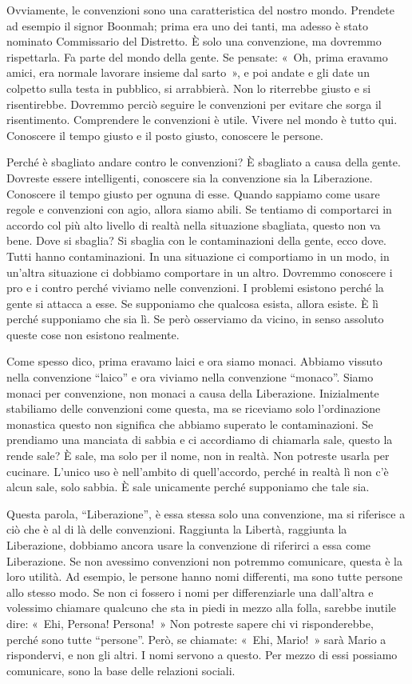 Ovviamente, le convenzioni sono una caratteristica del nostro mondo.
Prendete ad esempio il signor Boonmah; prima era uno dei tanti, ma
adesso è stato nominato Commissario del Distretto. È solo una
convenzione, ma dovremmo rispettarla. Fa parte del mondo della gente. Se
pensate: «~Oh, prima eravamo amici, era normale lavorare insieme dal
sarto~», e poi andate e gli date un colpetto sulla testa in pubblico, si
arrabbierà. Non lo riterrebbe giusto e si risentirebbe. Dovremmo perciò
seguire le convenzioni per evitare che sorga il risentimento.
Comprendere le convenzioni è utile. Vivere nel mondo è tutto qui.
Conoscere il tempo giusto e il posto giusto, conoscere le persone.

Perché è sbagliato andare contro le convenzioni? È sbagliato a causa
della gente. Dovreste essere intelligenti, conoscere sia la convenzione
sia la Liberazione. Conoscere il tempo giusto per ognuna di esse. Quando
sappiamo come usare regole e convenzioni con agio, allora siamo abili.
Se tentiamo di comportarci in accordo col più alto livello di realtà
nella situazione sbagliata, questo non va bene. Dove si sbaglia? Si
sbaglia con le contaminazioni della gente, ecco dove. Tutti hanno
contaminazioni. In una situazione ci comportiamo in un modo, in un'altra
situazione ci dobbiamo comportare in un altro. Dovremmo conoscere i pro
e i contro perché viviamo nelle convenzioni. I problemi esistono perché
la gente si attacca a esse. Se supponiamo che qualcosa esista, allora
esiste. È lì perché supponiamo che sia lì. Se però osserviamo da vicino,
in senso assoluto queste cose non esistono realmente.

Come spesso dico, prima eravamo laici e ora siamo monaci. Abbiamo
vissuto nella convenzione ``laico'' e ora viviamo nella convenzione
``monaco''. Siamo monaci per convenzione, non monaci a causa della
Liberazione. Inizialmente stabiliamo delle convenzioni come questa, ma
se riceviamo solo l'ordinazione monastica questo non significa che
abbiamo superato le contaminazioni. Se prendiamo una manciata di sabbia
e ci accordiamo di chiamarla sale, questo la rende sale? È sale, ma solo
per il nome, non in realtà. Non potreste usarla per cucinare. L'unico
uso è nell'ambito di quell'accordo, perché in realtà lì non c'è alcun
sale, solo sabbia. È sale unicamente perché supponiamo che tale sia.

Questa parola, ``Liberazione'', è essa stessa solo una convenzione, ma
si riferisce a ciò che è al di là delle convenzioni. Raggiunta la
Libertà, raggiunta la Liberazione, dobbiamo ancora usare la convenzione
di riferirci a essa come Liberazione. Se non avessimo convenzioni non
potremmo comunicare, questa è la loro utilità. Ad esempio, le persone
hanno nomi differenti, ma sono tutte persone allo stesso modo. Se non ci
fossero i nomi per differenziarle una dall'altra e volessimo chiamare
qualcuno che sta in piedi in mezzo alla folla, sarebbe inutile dire:
«~Ehi, Persona! Persona!~» Non potreste sapere chi vi risponderebbe,
perché sono tutte ``persone''. Però, se chiamate: «~Ehi, Mario!~» sarà
Mario a rispondervi, e non gli altri. I nomi servono a questo. Per mezzo
di essi possiamo comunicare, sono la base delle relazioni sociali.


